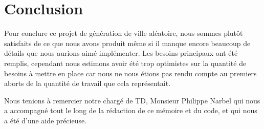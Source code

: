 \section{Conclusion}

Pour conclure ce projet de génération de ville aléatoire, nous sommes plutôt satisfaits de ce que nous avons produit même si il manque encore beaucoup de détails que nous aurions aimé implémenter. Les besoins principaux ont été remplis, cependant nous estimons avoir été trop optimistes sur la quantité de besoins à mettre en place car nous ne nous étions pas rendu compte au premiers aborts de la quantité de travail que cela représentait.

Nous tenions à remercier notre chargé de TD, Monsieur Philippe Narbel qui nous a accompagné tout le long de la rédaction de ce mémoire et du code, et qui nous a été d'une aide précieuse.

